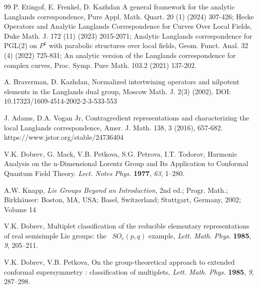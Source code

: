 \documentclass[a4paper]{jpconf}
\begin{document}
\begin{thebibliography}{99}
  P. Etingof, E. Frenkel, D.  Kazhdan
A general framework for the analytic Langlands correspondence,
 Pure Appl.  Math.  Quart.
 20 (1) (2024) 307-426;
 Hecke Operators and Analytic Langlands Correspondence for Curves Over Local Fields,
 Duke Math. J.
 172 (11) (2023) 2015-2071;
 Analytic Langlands correspondence for PGL(2) on $P^1$ with parabolic structures over local fields,
 Geom. Funct. Anal.
 32 (4) (2022) 725-831; %
An analytic version of the Langlands correspondence for complex curves,
 Proc.  Symp. Pure Math.
	103.2 (2021) 137-202.



 A. Braverman, D. Kazhdan,
Normalized intertwining operators and nilpotent elements in the Langlands dual group,
Moscow Math.  J. 2(3) (2002).
DOI: 10.17323/1609-4514-2002-2-3-533-553








 J. Adams, D.A. Vogan Jr,
Contragredient representations and characterizing the local Langlands correspondence,
Amer. J.  Math.  138,  3 (2016),  657-682.
https://www.jstor.org/stable/24736404




 V.K. Dobrev, G. Mack,  V.B. Petkova,  S.G. Petrova, I.T.  Todorov,
Harmonic Analysis on the n-Dimensional Lorentz Group and Its Application to Conformal Quantum Field Theory.
\emph{Lect. Notes Phys.} \textbf{1977}, \emph{63}, 1--280.

 A.W.  Knapp,  {\it Lie Groups Beyond an Introduction}, 2nd
ed.;  {Progr. Math.};  Birkh\"auser: Boston, MA, USA; Basel, Switzerland; Stuttgart, Germany, 2002; Volume 14







 {V.K. Dobrev},
Multiplet classification of the reducible
elementary representations of real semi\-simple Lie
groups: the \ $SO_e(p,q)$ example,
 \emph{Lett. Math. Phys.} {\bf 1985}, \emph{9}, 205--211.

V.K. Dobrev,  V.B. Petkova,
On the group-theoretical approach
to extended conformal supersymmetry : classification of multiplets,
  \emph{Lett. Math. Phys.} {\bf 1985},
 \emph{9}, 287--298.


\end{thebibliography}
\end{document}
